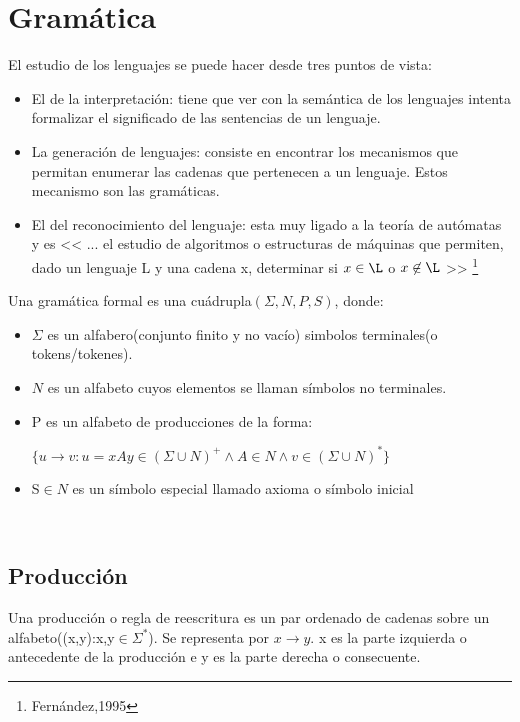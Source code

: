 


\section{Gramática}

El estudio de los lenguajes se puede hacer desde tres puntos de vista:
\begin{itemize}
	\item El de la interpretación: tiene que ver con la semántica de los lenguajes intenta formalizar el significado de las sentencias de un lenguaje.
	
	\item La generación de lenguajes: consiste en encontrar los mecanismos que permitan enumerar las cadenas que pertenecen a un lenguaje. Estos mecanismo son las gramáticas.
	
	
	\item El del reconocimiento del lenguaje: esta muy ligado a la teoría de autómatas y es << ... el estudio de algoritmos o estructuras de máquinas que permiten, dado un lenguaje L y una cadena x, determinar si $ x\in\L$ o  $x\not\in\L$ >> \footnote{ Fernández,1995} 
	
	
\end{itemize}
Una gramática formal es una cuádrupla$(\Sigma,N,P,S)$, donde:
\begin{itemize}
\item $\Sigma$ es un alfabero(conjunto finito y no vacío) simbolos terminales(o tokens/tokenes).
\item $N$ es un alfabeto cuyos elementos se llaman símbolos no terminales.
\item P es un alfabeto de producciones de la forma:


$\lbrace u\rightarrow v:  u=xAy\in(\Sigma\cup N)^{+}\wedge A \in N\wedge v\in(\Sigma\cup N)^{*}\rbrace$
\item S$\in N$ es un símbolo especial llamado axioma o símbolo inicial
\end{itemize}

\
\subsection{Producción}
Una producción o regla de reescritura es un par ordenado de cadenas sobre un alfabeto((x,y):x,y$ \in\Sigma^{\ast}$). Se representa por $x\rightarrow y$. x es la parte izquierda o antecedente de la producción e y es la parte derecha o consecuente.
